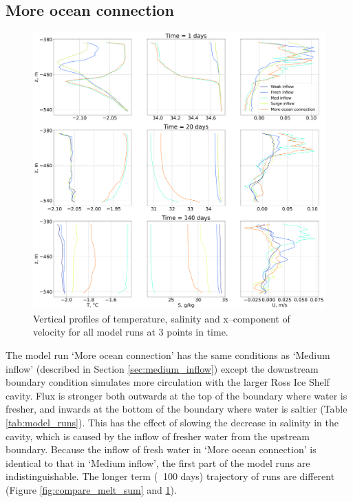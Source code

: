 \subsection{More ocean connection} \label{sec:fresh_output}

\begin{figure}[!ht]
\centering
\includegraphics[width=1\textwidth]{chapters/4/compare_all_TSU.png}
\caption[All model runs comparison (T,S,U)]{Vertical profiles of temperature, salinity and x--component of velocity for all model runs at 3 points in time.}
\label{fig:compare_all_TSU}
\end{figure}

The model run `More ocean connection' has the same conditions  as `Medium inflow' (described in Section \ref{sec:medium_inflow})  except the downstream boundary condition simulates more circulation with the larger Ross Ice Shelf cavity. Flux is stronger both outwards at the top of the boundary where water is fresher, and inwards at the bottom of the boundary where water is saltier (Table \ref{tab:model_runs}). This has the effect of slowing the decrease in salinity in the cavity, which is caused by the inflow of fresher water from the upstream boundary. Because the inflow of fresh water in `More ocean connection' is identical to that in `Medium inflow', the first part of the model runs are indistinguishable. The longer term ($\>$ 100 days) trajectory of runs are different (Figure \ref{fig:compare_melt_sum} and \ref{fig:compare_all_TSU}).

